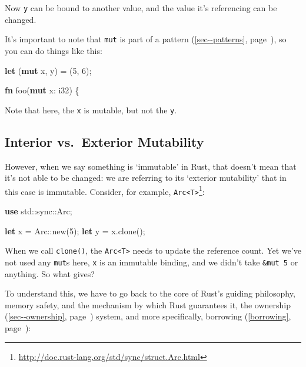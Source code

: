 \documentclass[a4paper,]{book}
\renewcommand*{\hyperlink}[2]{%
 #2 (\autoref{#1}, page~\pageref{#1})}
\newenvironment{Shaded}{\begin{snugshade}}{\end{snugshade}}
\newcommand{\KeywordTok}[1]{\textcolor[rgb]{0.13,0.29,0.53}{\textbf{{#1}}}}
\newcommand{\DataTypeTok}[1]{\textcolor[rgb]{0.13,0.29,0.53}{{#1}}}
\newcommand{\DecValTok}[1]{\textcolor[rgb]{0.00,0.00,0.81}{{#1}}}
\newcommand{\NormalTok}[1]{{#1}}
\renewcommand{\href}[2]{#2\footnote{\url{#1}}}
\begin{document}
Now \texttt{y} can be bound to another value, and the value it's
referencing can be changed.

It's important to note that \texttt{mut} is part of a
\protect\hyperlink{sec--patterns}{pattern}, so you can do things like
this:

\begin{Shaded}
\begin{Highlighting}[]
\KeywordTok{let} \NormalTok{(}\KeywordTok{mut} \NormalTok{x, y) = (}\DecValTok{5}\NormalTok{, }\DecValTok{6}\NormalTok{);}

\KeywordTok{fn} \NormalTok{foo(}\KeywordTok{mut} \NormalTok{x: }\DataTypeTok{i32}\NormalTok{) \{}
\end{Highlighting}
\end{Shaded}

Note that here, the \texttt{x} is mutable, but not the \texttt{y}.

\subsection{Interior vs.~Exterior
Mutability}\label{interior-vs.exterior-mutability}

However, when we say something is `immutable' in Rust, that doesn't mean
that it's not able to be changed: we are referring to its `exterior
mutability' that in this case is immutable. Consider, for example,
\href{http://doc.rust-lang.org/std/sync/struct.Arc.html}{\texttt{Arc\textless{}T\textgreater{}}}:

\begin{Shaded}
\begin{Highlighting}[]
\KeywordTok{use} \NormalTok{std::sync::Arc;}

\KeywordTok{let} \NormalTok{x = Arc::new(}\DecValTok{5}\NormalTok{);}
\KeywordTok{let} \NormalTok{y = x.clone();}
\end{Highlighting}
\end{Shaded}

When we call \texttt{clone()}, the
\texttt{Arc\textless{}T\textgreater{}} needs to update the reference
count. Yet we've not used any \texttt{mut}s here, \texttt{x} is an
immutable binding, and we didn't take \texttt{\&mut\ 5} or anything. So
what gives?

To understand this, we have to go back to the core of Rust's guiding
philosophy, memory safety, and the mechanism by which Rust guarantees
it, the \protect\hyperlink{sec--ownership}{ownership} system, and more
specifically, \protect\hyperlink{borrowing}{borrowing}:
\end{document}
